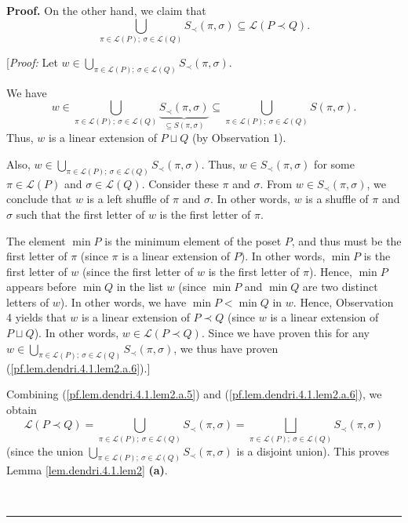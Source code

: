 \documentclass[numbers=enddot,12pt,final,onecolumn,notitlepage]{scrartcl}%
\theoremstyle{definition}
\newenvironment{proof}[1][Proof]{\noindent\textbf{#1.} }{\ \rule{0.5em}{0.5em}}
\newenvironment{verlong}{}{}
\begin{document}
\begin{verlong}
\begin{proof}
On the other hand, we claim that
\begin{equation}
\bigcup_{\pi\in\mathcal{L}\left(  P\right)  ;\ \sigma\in\mathcal{L}\left(
Q\right)  }S_{\prec}\left(  \pi,\sigma\right)  \subseteq\mathcal{L}\left(
P\left.  \prec\right.  Q\right)  .\label{pf.lem.dendri.4.1.lem2.a.6}%
\end{equation}


[\textit{Proof:} Let $w\in\bigcup_{\pi\in\mathcal{L}\left(  P\right)
;\ \sigma\in\mathcal{L}\left(  Q\right)  }S_{\prec}\left(  \pi,\sigma\right)
$.

We have%
\[
w\in\bigcup_{\pi\in\mathcal{L}\left(  P\right)  ;\ \sigma\in\mathcal{L}\left(
Q\right)  }\underbrace{S_{\prec}\left(  \pi,\sigma\right)  }_{\subseteq
S\left(  \pi,\sigma\right)  }\subseteq\bigcup_{\pi\in\mathcal{L}\left(
P\right)  ;\ \sigma\in\mathcal{L}\left(  Q\right)  }S\left(  \pi
,\sigma\right)  .
\]
Thus, $w$ is a linear extension of $P\sqcup Q$ (by Observation 1).

Also, $w\in\bigcup_{\pi\in\mathcal{L}\left(  P\right)  ;\ \sigma
\in\mathcal{L}\left(  Q\right)  }S_{\prec}\left(  \pi,\sigma\right)  $.
Thus, $w\in S_{\prec}\left(  \pi,\sigma\right)  $ for some $\pi\in
\mathcal{L}\left(  P\right)  $ and $\sigma\in\mathcal{L}\left(  Q\right)  $.
Consider these $\pi$ and $\sigma$. From $w\in S_{\prec}\left(  \pi
,\sigma\right)  $, we conclude that $w$ is a left shuffle of $\pi$ and
$\sigma$. In other words, $w$ is a shuffle of $\pi$ and $\sigma$ such that the
first letter of $w$ is the first letter of $\pi$.

The element $\min P$ is the minimum element of the poset $P$, and thus must be
the first letter of $\pi$ (since $\pi$ is a linear extension of $P$). In other
words, $\min P$ is the first letter of $w$ (since the first letter of $w$ is
the first letter of $\pi$). Hence, $\min P$ appears before $\min Q$ in the
list $w$ (since $\min P$ and $\min Q$ are two distinct letters of $w$). In
other words, we have $\min P<\min Q$ in $w$. Hence, Observation 4 yields that
$w$ is a linear extension of $P\left.  \prec\right.  Q$ (since $w$ is a linear
extension of $P\sqcup Q$). In other words, $w\in\mathcal{L}\left(  P\left.
\prec\right.  Q\right)  $. Since we have proven this for any $w\in\bigcup
_{\pi\in\mathcal{L}\left(  P\right)  ;\ \sigma\in\mathcal{L}\left(  Q\right)
}S_{\prec}\left(  \pi,\sigma\right)  $, we thus have proven
(\ref{pf.lem.dendri.4.1.lem2.a.6}).]

Combining (\ref{pf.lem.dendri.4.1.lem2.a.5}) and
(\ref{pf.lem.dendri.4.1.lem2.a.6}), we obtain
\[
\mathcal{L}\left(  P\left.  \prec\right.  Q\right)  =\bigcup_{\pi
\in\mathcal{L}\left(  P\right)  ;\ \sigma\in\mathcal{L}\left(  Q\right)
}S_{\prec}\left(  \pi,\sigma\right)  =\bigsqcup_{\pi\in\mathcal{L}\left(
P\right)  ;\ \sigma\in\mathcal{L}\left(  Q\right)  }S_{\prec}\left(
\pi,\sigma\right)
\]
(since the union $\bigcup_{\pi\in\mathcal{L}\left(  P\right)  ;\ \sigma
\in\mathcal{L}\left(  Q\right)  }S_{\prec}\left(  \pi,\sigma\right)  $ is a
disjoint union). This proves Lemma \ref{lem.dendri.4.1.lem2} \textbf{(a)}.


\end{proof}
\end{verlong}
\end{document}
